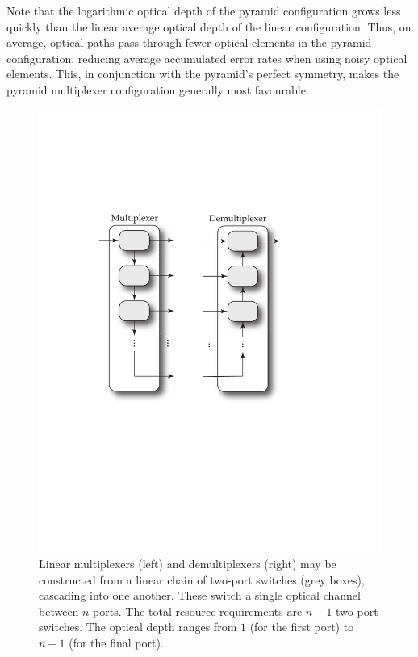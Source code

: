 \documentclass[aps,rmp,twocolumn,amsmath,amssymb,nofootinbib,superscriptaddress,longbibliography,floatfix,table-of-contents,eqsecnum]{revtex4-1}
\begin{document}
Note that the logarithmic optical depth of the pyramid configuration grows less quickly than the linear average optical depth of the linear configuration. Thus, on average, optical paths pass through fewer optical elements in the pyramid configuration, reducing average accumulated error rates when using noisy optical elements. This, in conjunction with the pyramid's perfect symmetry, makes the pyramid multiplexer configuration generally most favourable.

\begin{figure}[!htb]
\includegraphics[width=0.85\columnwidth]{linear_multiplexer}
\caption{Linear multiplexers (left) and demultiplexers (right) may be constructed from a linear chain of two-port switches (grey boxes), cascading into one another. These switch a single optical channel between $n$ ports. The total resource requirements are \mbox{$n-1$} two-port switches. The optical depth ranges from $1$ (for the first port) to \mbox{$n-1$} (for the final port).} \label{fig:linear_multiplexer} 
\end{figure}
\end{document}
